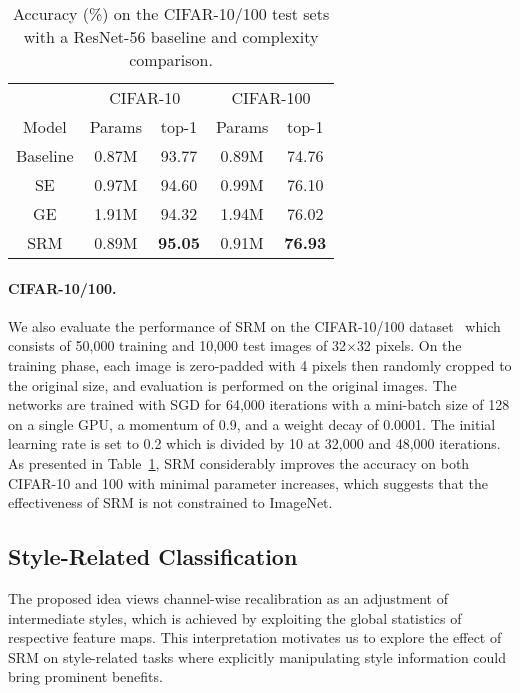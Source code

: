 \begin{table}
\caption{Accuracy (\%) on the CIFAR-10/100 test sets with a ResNet-56 baseline and complexity comparison.}
\vspace{-1em}
\begin{center}
\begin{tabular}{c|c|c|c|c}
\hline
 & \multicolumn{2}{|c|}{CIFAR-10} & \multicolumn{2}{|c}{CIFAR-100} \\ \cline{2-5}
Model & Params & top-1 & Params & top-1 \\
\hline
Baseline & 0.87M &  93.77 & 0.89M & 74.76 \\
SE & 0.97M & 94.60 & 0.99M & 76.10  \\
GE & 1.91M & 94.32 & 1.94M & 76.02  \\
SRM & 0.89M  & \textbf{95.05} & 0.91M  & \textbf{76.93} \\
\hline
\end{tabular}
\end{center}
\label{table:cifar}
\end{table}

\paragraph{CIFAR-10/100.}
We also evaluate the performance of SRM on the CIFAR-10/100 dataset~\cite{krizhevsky2009learning} which consists of 50,000 training and 10,000 test images of 32$\times$32 pixels.
On the training phase, each image is zero-padded with 4 pixels then randomly cropped to the original size, and evaluation is performed on the original images.
The networks are trained with SGD for 64,000 iterations with a mini-batch size of 128 on a single GPU, a momentum of 0.9, and a weight decay of 0.0001. The initial learning rate is set to 0.2 which is divided by 10 at 32,000 and 48,000 iterations.
As presented in Table~\ref{table:cifar}, SRM considerably improves the accuracy on both CIFAR-10 and 100 with minimal parameter increases, which suggests that the effectiveness of SRM is not constrained to ImageNet.


\subsection{Style-Related Classification}

The proposed idea views channel-wise recalibration as an adjustment of intermediate styles, which is achieved by exploiting the global statistics of respective feature maps.
This interpretation motivates us to explore the effect of SRM on style-related tasks where explicitly manipulating style information could bring prominent benefits.

